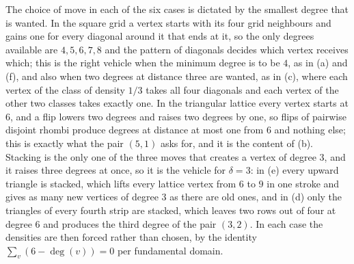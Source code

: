 \documentclass[12pt,a4paper]{article}%
\begin{document}
The choice of move in each of the six cases is dictated by the smallest degree that is wanted. In
the square grid a vertex starts with its four grid neighbours and gains one for every diagonal around
it that ends at it, so the only degrees available are $4,5,6,7,8$ and the pattern of diagonals decides
which vertex receives which; this is the right vehicle when the minimum degree is to be $4$, as in
(a) and (f), and also when two degrees at distance three are wanted, as in (c), where each vertex of
the class of density $1/3$ takes all four diagonals and each vertex of the other two classes takes
exactly one. In the triangular lattice every vertex starts at $6$, and a flip lowers two degrees and
raises two degrees by one, so flips of pairwise disjoint rhombi produce degrees at distance at most
one from $6$ and nothing else; this is exactly what the pair $(5,1)$ asks for, and it is the content
of (b). Stacking is the
only one of the three moves that creates a vertex of degree $3$, and it raises three degrees at once,
so it is the vehicle for $\delta =3$: in (e) every upward triangle is stacked, which lifts every
lattice vertex from $6$ to $9$ in one stroke and gives as many new vertices of degree $3$ as there are
old ones, and in (d) only the triangles of every fourth strip are stacked, which leaves two rows out
of four at degree $6$ and produces the third degree of the pair $(3,2)$. In each case the densities
are then forced rather than chosen, by the identity $\sum_{v}(6-\deg (v))=0$ per fundamental domain.


%
\end{document}
